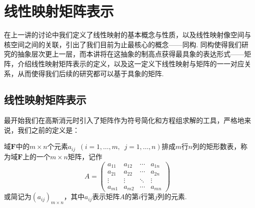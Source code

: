 \chapter{线性映射矩阵表示}

在上一讲的讨论中我们定义了线性映射的基本概念与性质，以及线性映射像空间与核空间之间的关联，引出了我们目前为止最核心的概念——同构. 同构使得我们研究的抽象层次更上一层，而本讲将在这抽象的制高点获得最具象的表达形式——矩阵，介绍线性映射矩阵表示的定义，以及这一定义下线性映射与矩阵的一一对应关系，从而使得我们后续的研究都可以基于具象的矩阵.

\section{线性映射矩阵表示}

最开始我们在高斯消元时引入了矩阵作为符号简化和方程组求解的工具，严格地来说，我们之前的定义是：
\begin{definition}{}{}
    域$\mathbf{F}$中的$m\times n$个元素$a_{ij}\enspace(i=1,\ldots,m,\enspace j=1,\ldots,n)$排成$m$行$n$列的矩形数表，称为域$\mathbf{F}$上的一个$m\times n$矩阵，记作
    \[A=\begin{pmatrix}
            a_{11} & a_{12} & \cdots & a_{1n} \\
            a_{21} & a_{22} & \cdots & a_{2n} \\
            \vdots & \vdots & \ddots & \vdots \\
            a_{m1} & a_{m2} & \cdots & a_{mn}
        \end{pmatrix}\]
    或简记为$(a_{ij})_{m\times n}$，其中$a_{ij}$表示矩阵$A$的第$i$行第$j$列的元素.
\end{definition}

